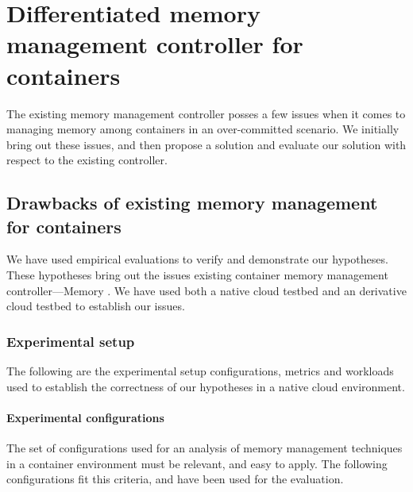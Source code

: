 
\chapter{Differentiated memory management controller for containers}

  The existing memory management controller posses a few issues when it comes to managing memory among containers in an
  over-committed scenario. We initially bring out these issues, and then propose a solution and evaluate our solution
  with respect to the existing controller.
  
  \section{Drawbacks of existing memory management for containers}
  \label{sec:controller_issues}
  
    We have used empirical evaluations to verify and demonstrate our hypotheses. These hypotheses bring out the issues existing container
    memory management controller---Memory \cg{}. We have used both a native cloud testbed and an derivative cloud testbed to establish 
    our issues.
    
    \subsection{Experimental setup}
    
      The following are the experimental setup configurations, metrics and workloads used to establish the correctness of our hypotheses
      in a native cloud environment.
      
       \subsubsection{Experimental configurations}
    
	The set of configurations used for an analysis of memory management techniques in a container environment must be relevant, 
	and easy to apply. The following configurations fit this criteria, and have been used for the evaluation.
	
